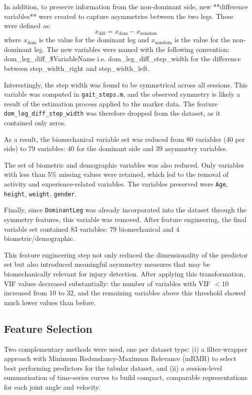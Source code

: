 In addition, to preserve information from the non-dominant side, new **difference variables** were created to capture asymmetries between the two legs. These were defined as:
\begin{equation}
    x_{\mathrm{diff}} = x_{\mathrm{dom}} - x_{\mathrm{nondom}}
\end{equation}
where $x_{\mathrm{dom}}$ is the value for the dominant leg and $x_{\mathrm{nondom}}$ is the value for the non-dominant leg. The new variables were named with the following convention: dom\_leg\_diff\_\$VariableName i.e. dom\_leg\_diff\_step\_width for the difference between step\_width\_right and step\_width\_left.

Interestingly, the step width was found to be symmetrical across all sessions. This variable was computed in \texttt{gait\_steps.m}, and the observed symmetry is likely a result of the estimation process applied to the marker data. The feature \texttt{dom\_leg\_diff\_step\_width} was therefore dropped from the dataset, as it contained only zeros.  

As a result, the biomechanical variable set was reduced from 80 variables (40 per side) to 79 variables: 40 for the dominant side and 39 asymmetry variables.  

The set of biometric and demographic variables was also reduced. Only variables with less than 5\% missing values were retained, which led to the removal of activity and experience-related variables. The variables preserved were \texttt{Age}, \texttt{height}, \texttt{weight}, \texttt{gender}.  

Finally, since \texttt{DominantLeg} was already incorporated into the dataset through the symmetry features, this variable was removed. After feature engineering, the final variable set contained 83 variables: 79 biomechanical and 4 biometric/demographic.

This feature engineering step not only reduced the dimensionality of the predictor set but also introduced meaningful asymmetry measures that may be biomechanically relevant for injury detection. After applying this transformation, VIF values decreased substantially: the number of variables with VIF $< 10$ increased from 10 to 32, and the remaining variables above this threshold showed much lower values than before.

\subsection{Feature Selection}\label{subsec:method-feature-selection}
Two complementary methods were used, one per dataset type: (i) a filter-wrapper approach with Minimum Redundancy-Maximum Relevance (mRMR) to select best performing predictors for the tabular dataset, and (ii) a session-level summarisation of time-series curves to build compact, comparable representations for each joint angle and velocity.

